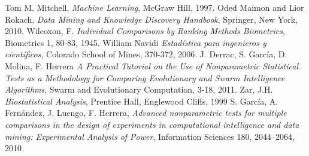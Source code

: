 
\begin{thebibliography}{99}
 Tom M. Mitchell, \textit{Machine Learning}, McGraw Hill, 1997.
 Oded Maimon and Lior Rokach, \textit{Data Mining and Knowledge Discovery Handbook}, Springer, New York, 2010.
 Wilcoxon, F. \textit{Individual Comparisons by Ranking Methods Biometrics}, Biometrics 1, 80-83, 1945.
 William Navidi \textit{Estadística para ingenieros y científicos}, Colorado School of Mines, 370-372, 2006.
 J. Derrac, S. García, D. Molina, F. Herrera \textit{A Practical Tutorial on the Use of Nonparametric Statistical Tests as a Methodology for Comparing Evolutionary and Swarm Intelligence Algorithms}, Swarm and Evolutionary Computation, 3-18, 2011.
 Zar, J.H. \textit{Biostatistical Analysis}, Prentice Hall, Englewood Cliffs, 1999
 S. García, A. Fernández, J. Luengo, F. Herrera, \textit{Advanced nonparametric tests for multiple comparisons in the design of experiments in computational intelligence and data mining: Experimental Analysis of Power}, Information Sciences 180, 2044–2064, 2010 
\end{thebibliography}